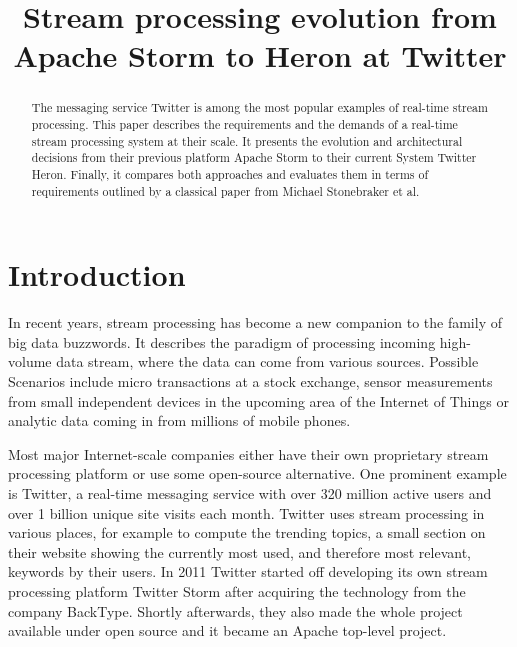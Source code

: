 \documentclass[conference]{IEEEtran}
\begin{document}
\title{Stream processing evolution from Apache Storm to Heron at Twitter}

\author{
}

\maketitle

\begin{abstract}

The messaging service Twitter is among the most popular examples of real-time stream processing.
This paper describes the requirements and the demands of a real-time stream processing system at their scale.
It presents the evolution and architectural decisions from their previous platform Apache Storm to their current System Twitter Heron.
Finally, it compares both approaches and evaluates them in terms of requirements outlined by a classical paper from Michael Stonebraker et al.

\end{abstract}

\section{Introduction}
\label{sec:Introduction}

In recent years, stream processing has become a new companion to the family of big data buzzwords.
It describes the paradigm of processing incoming high-volume data stream, where the data can come from various sources.
Possible Scenarios include micro transactions at a stock exchange, sensor measurements from small independent devices in the upcoming area of the Internet of Things or analytic data coming in from millions of mobile phones.

Most major Internet-scale companies either have their own proprietary stream processing platform or use some open-source alternative.
One prominent example is Twitter, a real-time messaging service with over 320 million active users and over 1 billion unique site visits each month.
Twitter uses stream processing in various places, for example to compute the trending topics, a small section on their website showing the currently most used, and therefore most relevant, keywords by their users.
In 2011 Twitter started off developing its own stream processing platform Twitter Storm after acquiring the technology from the company BackType.
Shortly afterwards, they also made the whole project available under open source and it became an Apache top-level project.
\end{document}
